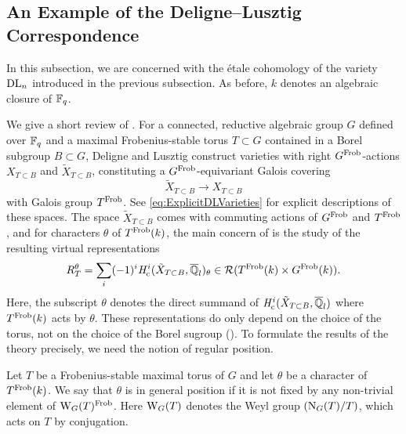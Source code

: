 \documentclass[../main.tex]{subfiles}
\begin{document}

\subsection{An Example of the Deligne--Lusztig Correspondence} %
\label{sub:The Deligne--Lusztig Correspondence for the Explicit Example}

In this subsection, we are concerned with the \'etale cohomology of the variety
$\mathrm{DL}_n$ introduced in the previous subsection. As before, $k$ denotes an algebraic
closure of $\mathbb{F}_q$.

We give a short review of \cite{delignelusztig1976}.
For a connected, reductive algebraic group $G$ defined over $\mathbb{F}_q$ and a maximal
Frobenius-stable torus $T \subset G$ contained in a Borel subgroup $B
\subset G$, Deligne and Lusztig construct varieties with right $G^{\mathrm{Frob}}$-actions
$X_{T\subset B}$ and $\tilde X_{T \subset B}$, constituting a $G^{\mathrm{Frob}}$-equivariant
Galois covering
\begin{equation*}
  \tilde X_{T \subset B} \to X_{T \subset B}
\end{equation*}
with Galois group $T^{\mathrm{Frob}}$. See \eqref{eq:ExplicitDLVarieties} for explicit
descriptions of these spaces. The space $\tilde X_{T \subset B}$ comes with
commuting actions of $G^{\mathrm{Frob}}$ and $T^{\mathrm{Frob}}$, and for characters $\theta$ of $T^{\mathrm{Frob}}(k)$,
the main concern of \cite{delignelusztig1976} is the study of the resulting
virtual representations
\begin{equation} \label{eq:DLRepresentation}
  R_{T}^\theta = \sum_{i} (-1)^i \mathit H_{\mathrm{c}}^i(\tilde X_{T \subset B}, \overline
  {\mathbb{Q}}_l)_\theta \in \mathcal{R}(T^{\mathrm{Frob}}(k) \times G^{\mathrm{Frob}}(k)).
\end{equation}
Here, the subscript $\theta$ denotes the direct summand of $\mathit H_{\mathrm{c}}^i(\tilde X_{T
\subset B}, \overline {\mathbb{Q}}_l)$ where $T^{\mathrm{Frob}}(k)$ acts by $\theta$.
These representations do only depend on the choice of the torus, not on the
choice of the Borel sugroup
(\cite[Corollary 4.3]{delignelusztig1976}). To formulate the results of the theory 
precisely, we need the notion of regular position.

\begin{defi}\label{def:DLGeomConjRegularPos}
  Let $T$ be a Frobenius-stable maximal  torus of $G$ and let $\theta$ be a character
  of $T^{\mathrm{Frob}}(k)$. We say that $\theta$ is in general position if it is not fixed by any
  non-trivial element of $\mathrm W_G(T)^{\mathrm{Frob}}$. Here $\mathrm W_G(T)$ denotes the Weyl
  group $(\operatorname{N}_G(T)/T)$, which acts on $T$ by conjugation.
\end{defi}
\end{document}
